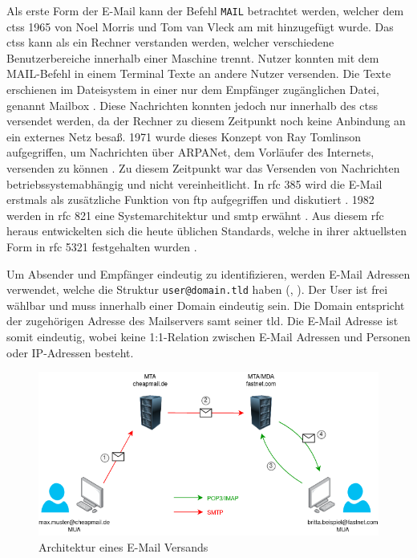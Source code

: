 Als erste Form der E-Mail kann der Befehl \texttt{MAIL} betrachtet werden, welcher dem \acrfull{ctss} 1965 von Noel Morris und Tom van Vleck am \acrfull{mit} hinzugefügt wurde. Das \acrshort{ctss} kann als ein Rechner verstanden werden, welcher verschiedene Benutzerbereiche innerhalb einer Maschine trennt. Nutzer konnten mit dem MAIL-Befehl in einem Terminal Texte an andere Nutzer versenden. Die Texte erschienen im Dateisystem in einer nur dem Empfänger zugänglichen Datei, genannt Mailbox \citep[S. 4]{Vleck2012}. Diese Nachrichten konnten jedoch nur innerhalb des \acrshort{ctss} versendet werden, da der Rechner zu diesem Zeitpunkt noch keine Anbindung an ein externes Netz besaß. 1971 wurde dieses Konzept von Ray Tomlinson aufgegriffen, um Nachrichten über ARPANet, dem Vorläufer des Internets, versenden zu können \citep[S. 4 ff.]{Partridge2008}. Zu diesem Zeitpunkt war das Versenden von Nachrichten betriebssystemabhängig und nicht vereinheitlicht. In \acrshort{rfc} 385 wird die E-Mail erstmals als zusätzliche Funktion von \acrshort{ftp} aufgegriffen und diskutiert \citep[S. 3 f.]{RFC385}. 1982 werden in \acrshort{rfc} 821 eine Systemarchitektur und \acrshort{smtp} erwähnt \citep[S. 2 ff.]{RFC821}. Aus diesem \acrshort{rfc} heraus entwickelten sich die heute üblichen Standards, welche in ihrer aktuellsten Form in \acrshort{rfc} 5321 festgehalten wurden \citep{RFC5321}.

Um Absender und Empfänger eindeutig zu identifizieren, werden E-Mail Adressen verwendet, welche die Struktur \texttt{user@domain.tld} haben (\cite[S. 4 f.]{RFC822}, \cite[S. 2 ff.]{RFC2142}). Der User ist frei wählbar und muss innerhalb einer Domain eindeutig sein. Die Domain entspricht der zugehörigen Adresse des Mailservers samt seiner \acrfull{tld}. Die E-Mail Adresse ist somit eindeutig, wobei keine 1:1-Relation zwischen E-Mail Adressen und Personen oder IP-Adressen besteht.

\begin{figure}[!ht]
	\centering
		\includegraphics[width=1\textwidth]{Figures/E-Mail Versand.png}
	\caption{Architektur eines E-Mail Versands}
	\label{fig:mail_architektur}
\end{figure}


